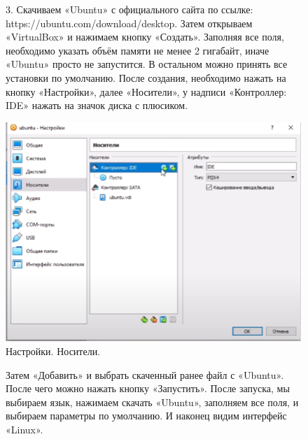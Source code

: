 \begin{figure}
3. Скачиваем «Ubuntu» с официального сайта по ссылке: https://ubuntu.com/download/desktop. Затем открываем «VirtualBox» и нажимаем кнопку «Создать». Заполняя все поля, необходимо указать объём памяти не менее 2 гигабайт, иначе «Ubuntu» просто не запустится. В остальном можно принять все установки по умолчанию. После создания, необходимо нажать на кнопку «Настройки», далее «Носители», у надписи «Контроллер: IDE» нажать на значок диска с плюсиком.

		\centering
		\includegraphics[width=0.65\linewidth]{img/4.png}
\caption{Настройки. Носители.}
\label{ris:image}

\end{figure}

\begin{figure}
\quad Затем «Добавить» и выбрать скаченный ранее файл с «Ubuntu». После чего можно нажать кнопку «Запустить». После запуска, мы выбираем язык, нажимаем скачать «Ubuntu», заполняем все поля, и выбираем параметры по умолчанию. И наконец видим интерфейс «Linux».
\end{figure}



